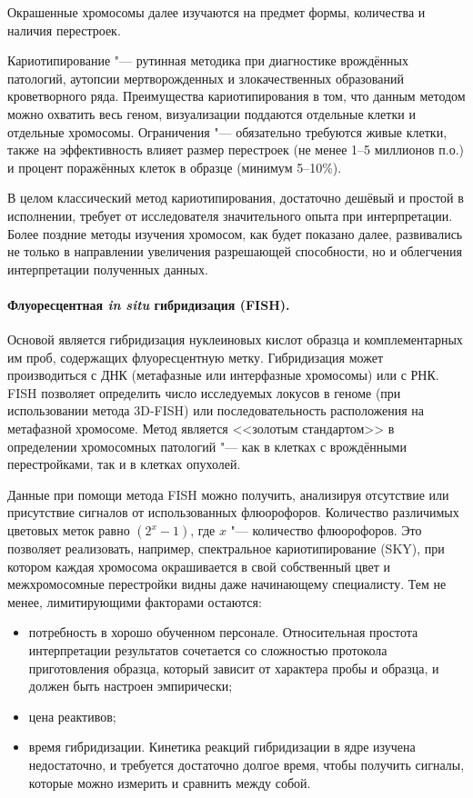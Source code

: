 \documentclass[a4paper,12pt]{article}
\begin{document}
Окрашенные хромосомы далее изучаются на предмет формы, количества и наличия перестроек.

Кариотипирование "--- рутинная методика при диагностике врождённых патологий, аутопсии мертворожденных и злокачественных образований кроветворного ряда.
Преимущества кариотипирования в том, что данным методом можно охватить весь геном, визуализации поддаются отдельные клетки и отдельные хромосомы.
Ограничения "--- обязательно требуются живые клетки, также на эффективность влияет размер перестроек (не менее 1--5 миллионов п.о.) и процент поражённых клеток в образце (минимум 5--10\%)\cite{sampson}.

В целом классический метод кариотипирования, достаточно дешёвый и простой в исполнении, требует от исследователя значительного опыта при интерпретации.
Более поздние методы изучения хромосом, как будет показано далее, развивались не только в направлении увеличения разрешающей способности, но и облегчения интерпретации полученных данных.

\paragraph{Флуоресцентная \textit{in situ} гибридизация (FISH).}
Основой является гибридизация нуклеиновых кислот образца и комплементарных им проб, содержащих флуоресцентную метку.
Гибридизация может производиться с ДНК (метафазные или интерфазные хромосомы) или с РНК.
FISH позволяет определить число исследуемых локусов в геноме (при использовании метода 3D-FISH) или последовательность расположения на метафазной хромосоме.
Метод является <<золотым стандартом>> в определении хромосомных патологий "--- как в клетках с врождёнными перестройками, так и в клетках опухолей.

Данные при помощи метода FISH можно получить, анализируя отсутствие или присутствие сигналов от использованных флюорофоров.
Количество различимых цветовых меток равно $(2^x - 1)$, где  $x$ "--- количество флюорофоров.
Это позволяет реализовать, например, спектральное кариотипирование (SKY), при котором каждая хромосома окрашивается в свой собственный цвет и межхромосомные перестройки видны даже начинающему специалисту\cite{guo}.
Тем не менее, лимитирующими факторами остаются:

\begin{itemize}
\item потребность в хорошо обученном персонале.
Относительная простота интерпретации результатов сочетается со сложностью протокола приготовления образца, который зависит от характера пробы и образца, и должен быть настроен эмпирически;
\item цена реактивов;
\item время гибридизации.
Кинетика реакций гибридизации в ядре изучена недостаточно, и требуется достаточно долгое время, чтобы получить сигналы, которые можно измерить и сравнить между собой.
\end{itemize}
\end{document}
